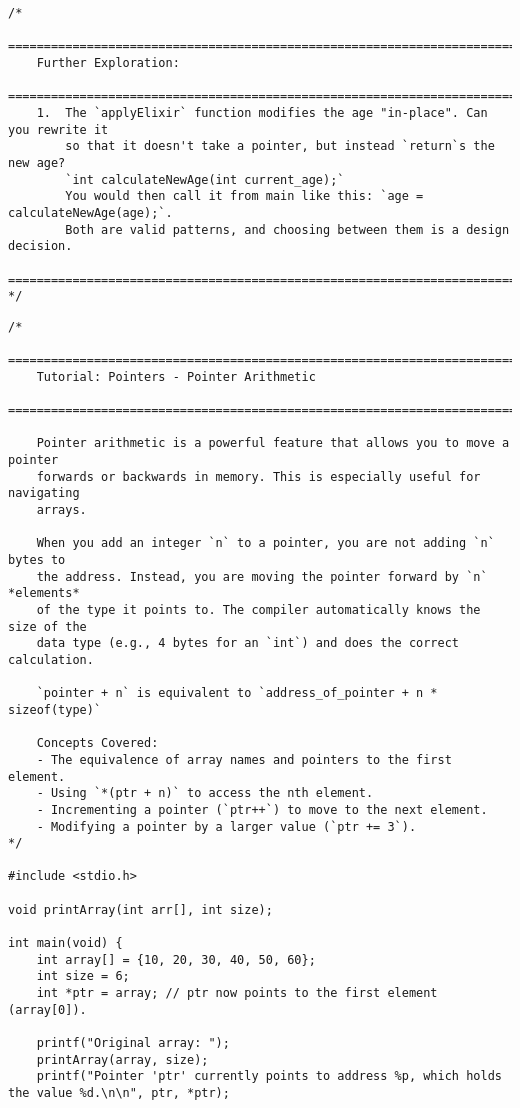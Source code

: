 \documentclass[11pt]{book}
\begin{document}
\begin{verbatim}
/*
    ================================================================================
    Further Exploration:
    ================================================================================
    1.  The `applyElixir` function modifies the age "in-place". Can you rewrite it
        so that it doesn't take a pointer, but instead `return`s the new age?
        `int calculateNewAge(int current_age);`
        You would then call it from main like this: `age = calculateNewAge(age);`.
        Both are valid patterns, and choosing between them is a design decision.
    ================================================================================
*/

\end{verbatim}
\clearpage
\begin{verbatim}
/*
    ================================================================================
    Tutorial: Pointers - Pointer Arithmetic
    ================================================================================

    Pointer arithmetic is a powerful feature that allows you to move a pointer
    forwards or backwards in memory. This is especially useful for navigating
    arrays.

    When you add an integer `n` to a pointer, you are not adding `n` bytes to
    the address. Instead, you are moving the pointer forward by `n` *elements*
    of the type it points to. The compiler automatically knows the size of the
    data type (e.g., 4 bytes for an `int`) and does the correct calculation.

    `pointer + n` is equivalent to `address_of_pointer + n * sizeof(type)`

    Concepts Covered:
    - The equivalence of array names and pointers to the first element.
    - Using `*(ptr + n)` to access the nth element.
    - Incrementing a pointer (`ptr++`) to move to the next element.
    - Modifying a pointer by a larger value (`ptr += 3`).
*/

#include <stdio.h>

void printArray(int arr[], int size);

int main(void) {
    int array[] = {10, 20, 30, 40, 50, 60};
    int size = 6;
    int *ptr = array; // ptr now points to the first element (array[0]).

    printf("Original array: ");
    printArray(array, size);
    printf("Pointer 'ptr' currently points to address %p, which holds the value %d.\n\n", ptr, *ptr);


\end{verbatim}
\end{document}
